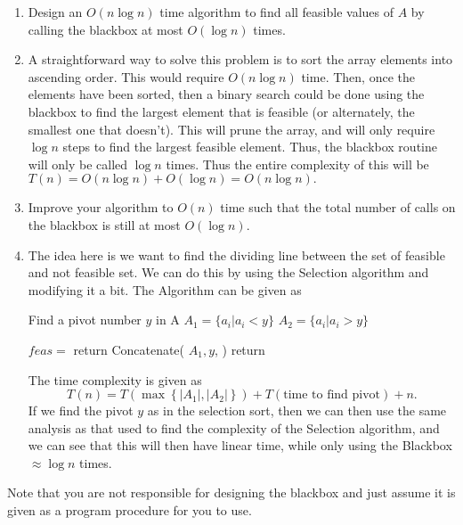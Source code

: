 \documentclass{article}
\begin{document}
\begin{enumerate}[label=(\alph*)]
\item Design an $O(n\log n)$ time algorithm to find all feasible
  values of $A$ by calling the blackbox at most $O(\log n)$ times.
\item[]
A straightforward way to solve this problem is to sort the array
elements into ascending order.  This would require $O(n\log n)$
time. Then, once the elements have been sorted, then a binary search
could be done using the blackbox to find the largest element that
is feasible (or alternately, the smallest one that doesn't).  This
will prune the array, and will only require $\log n$ steps to find the
largest feasible element. Thus, the blackbox routine will only be
called $\log n$ times.  Thus the entire complexity of this will be
$T(n) = O(n\log n) + O(\log n) = O(n\log n).$

\item Improve your algorithm to $O(n)$ time such that the total number
  of calls on the blackbox is still at most $O(\log n)$.
\item[]
The idea here is we want to find the dividing line between the set of
feasible and not feasible set.  We can do this by using the Selection
algorithm and modifying it a bit.
The Algorithm can be given as


{\singlespacing
\begin{algorithmic}
  \State Find a pivot number $y$ in A 
  \State $A_1 = \{a_i | a_i < y \}$    
  \State $A_2 = \{a_i | a_i > y \}$    
 
  \State $feas = $ 
    \State return {\sc Concatenate}( $A_1,y$,  ) 
  \Else%
    \State return 
  \EndIf
\EndFunction
\end{algorithmic}
}
The time complexity is given as
\begin{equation*}
     T(n) = T\left(\max\left\{\left|A_1\right|,
      \left|A_2\right|\right\}\right)  + T\left(\text{time to find
      pivot}\right)   + n. 
\end{equation*}
If we find the pivot $y$ as in the selection sort, then we can then
use the same analysis as that used to  find the complexity of the
Selection algorithm, and we can see that this will then have linear
time, while only using the Blackbox $\approx \log n$ times.



\end{enumerate}

Note that you are not responsible for designing the blackbox and just
assume it is given as a program procedure for you to use.
\end{document}
